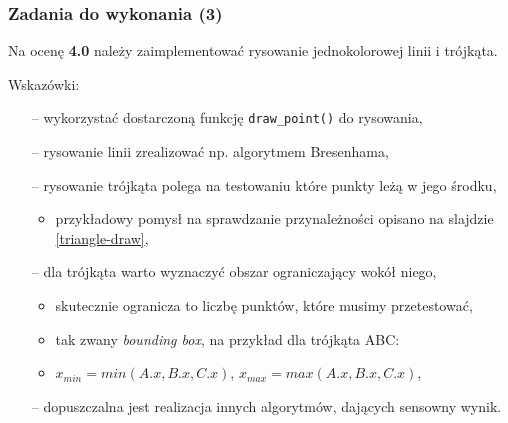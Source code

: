 \documentclass[usenames,dvipsnames,aspectratio=43,presentation]{beamer}
\begin{document}
    \begin{frame}
        \frametitle{Zadania do wykonania (3)}
        \footnotesize

        Na ocenę \textbf{4.0} należy zaimplementować rysowanie jednokolorowej linii i trójkąta.
        
        \vfill
        
        Wskazówki:
        \begin{itemize}
            \setlength{\itemsep}{0.5em}
            \item[--] wykorzystać dostarczoną funkcję \texttt{draw_point()} do rysowania,
            \item[--] rysowanie linii zrealizować np. algorytmem Bresenhama,
            \item[--] rysowanie trójkąta polega na testowaniu które punkty leżą w jego środku,
                      \begin{itemize}
                          \setlength{\itemsep}{0.25em}
                          \scriptsize
                          \item przykładowy pomysł na sprawdzanie przynależności opisano na slajdzie \ref{triangle-draw},
                      \end{itemize}
            \item[--] dla trójkąta warto wyznaczyć obszar ograniczający wokół niego,
                      \begin{itemize}
                          \setlength{\itemsep}{0.25em}
                          \scriptsize
                          \item skutecznie ogranicza to liczbę punktów, które musimy przetestować,
                          \item tak zwany \textit{bounding box}, na przykład dla trójkąta ABC:
                          \item $x_{min} = min(A.x, B.x, C.x)$, $x_{max} = max(A.x, B.x, C.x)$,
                      \end{itemize}
                  \item[--] dopuszczalna jest realizacja innych algorytmów, dających sensowny wynik.
        \end{itemize}
    \end{frame}
\end{document}

